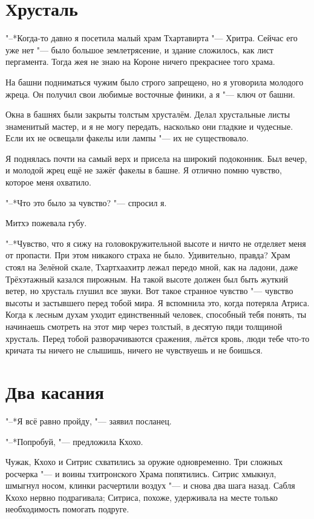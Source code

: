 \section{Хрусталь}

"--*Когда-то давно я посетила малый храм Тхартавирта "--- Хритра.
Сейчас его уже нет "--- было большое землетрясение, и здание сложилось, как лист пергамента.
Тогда же\ldotst я не знаю на Короне ничего прекраснее того храма.

На башни подниматься чужим было строго запрещено, но я уговорила молодого жреца.
Он получил свои любимые восточные финики, а я "--- ключ от башни.

Окна в башнях были закрыты толстым хрусталём.
Делал хрустальные листы знаменитый мастер, и я не могу передать, насколько они гладкие и чудесные.
Если их не освещали факелы или лампы "--- их не существовало.

Я поднялась почти на самый верх и присела на широкий подоконник.
Был вечер, и молодой жрец ещё не зажёг факелы в башне.
Я отлично помню чувство, которое меня охватило.

"--*Что это было за чувство? "--- спросил я.

Митхэ пожевала губу.

"--*Чувство, что я сижу на головокружительной высоте и ничто не отделяет меня от пропасти.
При этом никакого страха не было.
Удивительно, правда?
Храм стоял на Зелёной скале, Тхартхаахитр лежал передо мной, как на ладони, даже Трёхэтажный казался пирожным.
На такой высоте должен был быть жуткий ветер, но хрусталь глушил все звуки.
Вот такое странное чувство "--- чувство высоты и застывшего перед тобой мира.
Я вспомнила это, когда потеряла Атриса.
Когда к лесным духам уходит единственный человек, способный тебя понять, ты начинаешь смотреть на этот мир через толстый, в десятую пяди толщиной хрусталь.
Перед тобой разворачиваются сражения, льётся кровь, люди тебе что-то кричат\ldotst а ты ничего не слышишь, ничего не чувствуешь и не боишься.

\section{Два касания}

"--*Я всё равно пройду, "--- заявил посланец.

"--*Попробуй, "--- предложила Кхохо.

Чужак, Кхохо и Ситрис схватились за оружие одновременно.
Три сложных росчерка "--- и воины тхитронского Храма попятились.
Ситрис хмыкнул, шмыгнул носом, клинки расчертили воздух "--- и снова два шага назад.
Сабля Кхохо нервно подрагивала;
Ситриса, похоже, удерживала на месте только необходимость помогать подруге.

